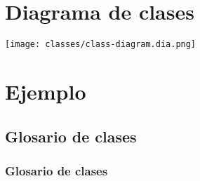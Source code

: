 \section{Diagrama de clases}
\texttt{[image: classes/class-diagram.dia.png]}

\section{Ejemplo}
\subsection{Glosario de clases}
\subsubsection{Glosario de clases}
